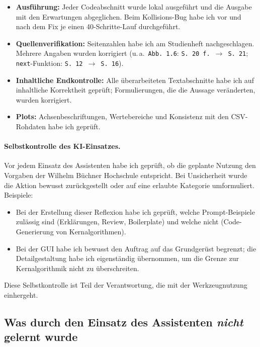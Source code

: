\begin{itemize}
    \item \textbf{Ausführung:} Jeder Codeabschnitt wurde lokal ausgeführt und die Ausgabe mit den Erwartungen abgeglichen. Beim Kollisions-Bug habe ich vor und nach dem Fix je einen 40-Schritte-Lauf durchgeführt.
    \item \textbf{Quellenverifikation:} Seitenzahlen habe ich am Studienheft nachgeschlagen. Mehrere Angaben wurden korrigiert (u.\,a.\ \texttt{Abb.~1.6}: \texttt{S.~20\,f.}~\(\to\)~\texttt{S.~21}; \texttt{next}-Funktion: \texttt{S.~12}~\(\to\)~\texttt{S.~16}).
    \item \textbf{Inhaltliche Endkontrolle:} Alle überarbeiteten Textabschnitte habe ich auf inhaltliche Korrektheit geprüft; Formulierungen, die die Aussage veränderten, wurden korrigiert.
    \item \textbf{Plots:} Achsenbeschriftungen, Wertebereiche und Konsistenz mit den \acs{CSV}-Rohdaten habe ich geprüft.
\end{itemize}

\paragraph{Selbstkontrolle des \acs{KI}-Einsatzes.}
Vor jedem Einsatz des Assistenten habe ich geprüft, ob die geplante Nutzung den Vorgaben der Wilhelm Büchner Hochschule entspricht. Bei Unsicherheit wurde die Aktion bewusst zurückgestellt oder auf eine erlaubte Kategorie umformuliert. Beispiele:

\begin{itemize}
    \item Bei der Erstellung dieser Reflexion habe ich geprüft, welche Prompt-Beispiele zulässig sind (Erklärungen, Review, Boilerplate) und welche nicht (Code-Generierung von Kernalgorithmen).
    \item Bei der \acs{GUI} habe ich bewusst den Auftrag auf das Grundgerüst begrenzt; die Detailgestaltung habe ich eigenständig übernommen, um die Grenze zur Kernalgorithmik nicht zu überschreiten.
\end{itemize}

Diese Selbstkontrolle ist Teil der Verantwortung, die mit der Werkzeugnutzung einhergeht.

\subsection{Was durch den Einsatz des Assistenten \textit{nicht} gelernt wurde}

